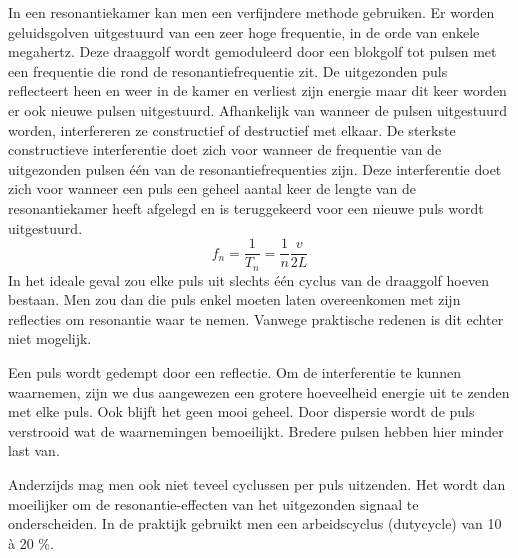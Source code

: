 In een resonantiekamer kan men een verfijndere methode gebruiken. Er worden 
geluidsgolven uitgestuurd van een zeer hoge frequentie, in de orde van enkele 
megahertz. Deze draaggolf wordt gemoduleerd door een blokgolf tot pulsen met 
een frequentie die rond de resonantiefrequentie zit. De uitgezonden puls 
reflecteert heen en weer in de kamer en verliest zijn energie maar dit keer 
worden er ook nieuwe pulsen uitgestuurd. Afhankelijk van wanneer de pulsen 
uitgestuurd worden, interfereren ze constructief of destructief met elkaar. De 
sterkste constructieve interferentie doet zich voor wanneer de frequentie van 
de uitgezonden pulsen \'e\'en van de resonantiefrequenties zijn. Deze 
interferentie doet zich voor wanneer een puls een geheel aantal keer de lengte 
van de resonantiekamer heeft afgelegd en is teruggekeerd voor een nieuwe puls 
wordt uitgestuurd.
\begin{equation}
\label{resfreq}
f_n = \frac{1}{T_n} = \frac{1}{n} \frac{v}{2L}
\end{equation}
In het ideale geval zou elke puls uit slechts \'e\'en cyclus van de draaggolf 
hoeven bestaan. Men zou dan die puls enkel moeten laten overeenkomen met zijn 
reflecties om resonantie waar te nemen. Vanwege praktische redenen is dit 
echter niet mogelijk.

Een puls wordt gedempt door een reflectie. Om de interferentie te kunnen 
waarnemen, zijn we dus aangewezen een grotere hoeveelheid energie uit te zenden 
met elke puls. Ook blijft het geen mooi geheel. Door dispersie wordt de puls 
verstrooid wat de waarnemingen bemoeilijkt. Bredere pulsen hebben hier minder 
last van.


Anderzijds mag men ook niet teveel cyclussen per puls uitzenden. Het wordt dan 
moeilijker om de resonantie-effecten van het uitgezonden signaal te 
onderscheiden. In de praktijk gebruikt men een arbeidscyclus (dutycycle) van 10 
\`a 20 \%.  




